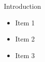 \documentclass[pdf]{beamer}
\begin{document}
\begin{frame}{Introduction}
    \begin{itemize}
        \item<1-2> Item 1
        \item<2> Item 2
        \item<3> Item 3
    \end{itemize}
\end{frame}
\end{document}
